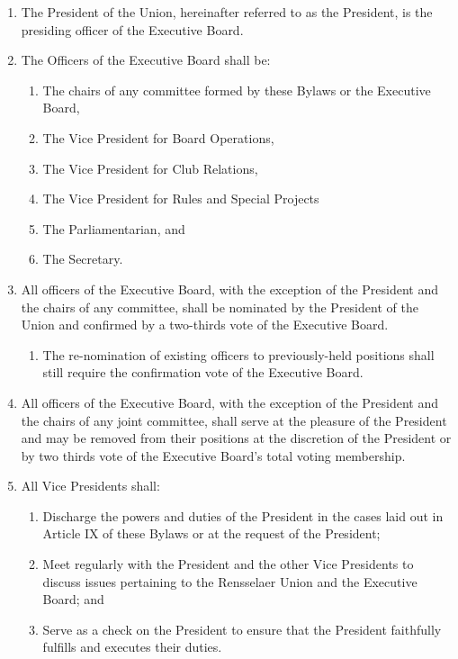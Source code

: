 
\begin{enumerate}
\item The President of the Union, hereinafter referred to as the President, is the presiding officer of the Executive Board.
\item The Officers of the Executive Board shall be:
  \begin{enumerate}
  \item The chairs of any committee formed by these Bylaws or the Executive Board,
  \item The Vice President for Board Operations,
  \item The Vice President for Club Relations,
  \item The Vice President for Rules and Special Projects
  \item The Parliamentarian, and
  \item The Secretary.
  \end{enumerate}
\item All officers of the Executive Board, with the exception of the President and the chairs of any committee, shall be nominated by the President of the Union and confirmed by a two-thirds vote of the Executive Board.
  \begin{enumerate}
  \item The re-nomination of existing officers to previously-held positions shall still require the confirmation vote of the Executive Board.
  \end{enumerate}
\item All officers of the Executive Board, with the exception of the President and the chairs of any joint committee, shall serve at the pleasure of the President and may be removed from their positions at the discretion of the President or by two thirds vote of the Executive Board’s total voting membership.
\item All Vice Presidents shall:
  \begin{enumerate}
  \item Discharge the powers and duties of the President in the cases laid out in Article IX of these Bylaws or at the request of the President;
  \item Meet regularly with the President and the other Vice Presidents to discuss issues pertaining to the Rensselaer Union and the Executive Board; and
  \item Serve as a check on the President to ensure that the President faithfully fulfills and executes their duties.

\end{enumerate}
\end{enumerate}
